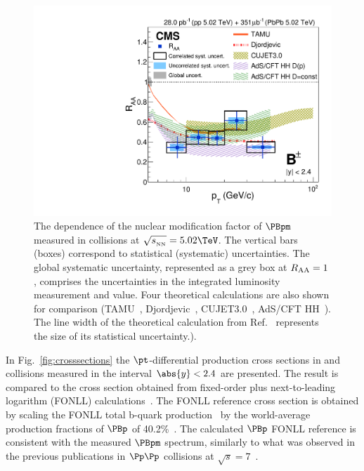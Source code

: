 \begin{figure}[tb]
\centering
\includegraphics[width=\cmsFigWidth]{Figure_003.pdf}
\caption{The \pt dependence of the nuclear modification factor \RAA of $\PBpm$ measured in \PbPb collisions at $\sqrtsNN=5.02\TeV$. The vertical bars (boxes) correspond to statistical (systematic) uncertainties.
The global systematic uncertainty, represented as a grey box at $R_{\mathrm{AA}}=1$, comprises the uncertainties in the integrated luminosity measurement and \TAA value. Four theoretical calculations are also shown for comparison (TAMU~\cite{He:2011qa, He:2014cla}, Djordjevic~\cite{Djordjevic:2016vfo}, CUJET3.0~\cite{Xu:2015bbz, Xu:2014tda, Xu:2014ica}, AdS/CFT HH~\cite{Horowitz:2015dta,  AdscftHH}). The line width of the theoretical calculation from Ref.~\cite{He:2011qa, He:2014cla} represents the size of its statistical uncertainty.).}
\label{fig:rpaall}
\end{figure}


In Fig.~\ref{fig:crosssections} the $\pt$-differential production cross sections in \pp and \PbPb collisions measured in the interval $\abs{y} < 2.4$ are presented. The \pp result is compared to the cross section obtained from fixed-order plus next-to-leading logarithm (FONLL) calculations~\cite{FONLLcharmbottomPP3}. The FONLL reference cross section is obtained by scaling the FONLL total b-quark production~\cite{FONLLcharmbottomPP1,FONLLcharmbottomPP2,FONLLcharmbottomPP3} by the world-average production fractions of $\PBp$ of 40.2\%~\cite{pdg:2016}.
The calculated $\PBp$ FONLL reference is consistent with the measured $\PBpm$ \pp spectrum, similarly to what was observed in the previous publications in $\pp$ collisions at $\sqrt{s}= 7$\TeV~\cite{CMSBmesonpp,Chatrchyan:2011pw,Chatrchyan:2011vh,ATLAS:2013cia,LHCb:2013JHEP}.

